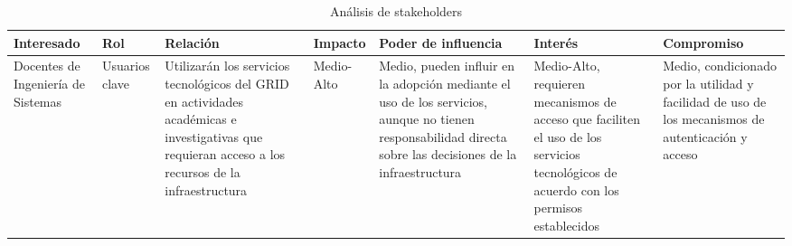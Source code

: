 \begin{table}[H]
	\centering
	\caption{Análisis de stakeholders}
	\label{tab:stakeholders}

	\renewcommand{\arraystretch}{1.25}
	\setlength{\tabcolsep}{4pt}
	\fontsize{7pt}{7pt}\selectfont

	\begin{tabularx}{\textwidth}{|
		>{\raggedright\arraybackslash}p{2.0cm}|
		>{\raggedright\arraybackslash}p{1.7cm}|
		>{\raggedright\arraybackslash}X|
		>{\raggedright\arraybackslash}p{1.5cm}|
		>{\raggedright\arraybackslash}X|
		>{\raggedright\arraybackslash}X|
		>{\raggedright\arraybackslash}p{2.0cm}|}

		\hline
		\tableheader
		\textbf{Interesado}                                                                                                                                          &
		\textbf{Rol}                                                                                                                                                 &
		\textbf{Relación}                                                                                                                                            &
		\textbf{Impacto}                                                                                                                                             &
		\textbf{Poder de influencia}                                                                                                                                 &
		\textbf{Interés}                                                                                                                                             &
		\textbf{Compromiso}
		\\
		\hline

		Docentes de Ingeniería de Sistemas                                                                                                                           &
		Usuarios clave                                                                                                                                               &
		Utilizarán los servicios tecnológicos del \acs{GRID} en actividades académicas e investigativas que requieran acceso a los recursos de la infraestructura          &
		Medio-Alto                                                                                                                                                   &
		Medio, pueden influir en la adopción mediante el uso de los servicios, aunque no tienen responsabilidad directa sobre las decisiones de la infraestructura   &
		Medio-Alto, requieren mecanismos de acceso que faciliten el uso de los servicios tecnológicos de acuerdo con los permisos establecidos                       &
		Medio, condicionado por la utilidad y facilidad de uso de los mecanismos de autenticación y acceso
		\\
		\hline


\end{tabularx}
\end{table}
